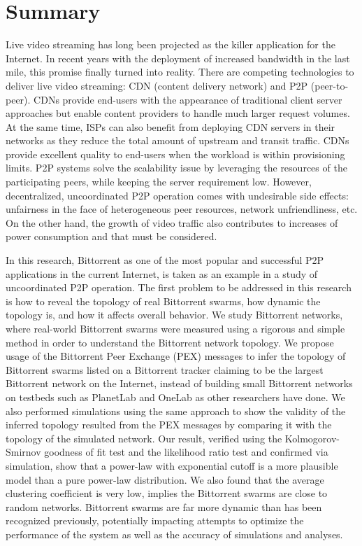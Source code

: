 
\chapter*{Summary}

Live video streaming has long been projected as the killer application for the Internet.  
In recent years with the deployment of increased bandwidth in the last mile, this promise finally turned into reality.
There are competing technologies to deliver live video streaming:  CDN (content delivery network) and P2P (peer-to-peer).
CDNs provide end-users with the appearance of traditional client server approaches but enable content providers to handle much larger request volumes.
At the same time, ISPs can also benefit from deploying CDN servers in their networks as they reduce the total amount of upstream and transit traffic. 
CDNs provide excellent quality to end-users when the workload is within provisioning limits.
P2P systems solve the scalability issue by leveraging the resources of the participating peers, while keeping the server requirement low.
However, decentralized, uncoordinated P2P operation comes with undesirable side effects: unfairness in the face of heterogeneous peer resources, network unfriendliness, etc. 
On the other hand, the growth of video traffic also contributes to increases of power consumption and that must be  considered.

In this research, Bittorrent as one of the most popular and successful P2P applications in the current Internet, is taken as an example in a study of uncoordinated P2P operation.
The first problem to be addressed in this research is how to reveal the topology of real Bittorrent swarms, how dynamic the topology is, and how it affects overall behavior.
We study Bittorrent networks, where real-world Bittorrent swarms were measured using a rigorous and simple method in order to understand the Bittorrent network topology. 
We propose  usage of the Bittorrent Peer Exchange (PEX) messages to infer the topology of Bittorrent swarms listed on a Bittorrent tracker claiming to be the largest Bittorrent network on the Internet, instead of building small Bittorrent networks on testbeds such as PlanetLab and OneLab as other researchers have done. 
We also performed simulations using the same approach to show the validity of the inferred topology  resulted from the PEX messages by comparing it with the topology of the simulated network.
Our result, verified using the Kolmogorov-Smirnov goodness of fit test and the likelihood ratio test and confirmed via simulation, show that a power-law with exponential cutoff is a more plausible model than a pure power-law distribution.  
We also found that the average clustering coefficient is very low, implies the Bittorrent swarms are close to random networks.  
Bittorrent swarms are far more dynamic than has been recognized previously, potentially impacting attempts to optimize the performance of the system as well as the accuracy of simulations and analyses. 

